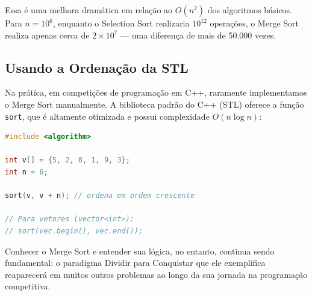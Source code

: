 \documentclass[12pt]{article}
\begin{document}
Essa é uma melhora dramática em relação ao $O(n^2)$ dos algoritmos básicos. Para $n = 10^6$, enquanto o Selection Sort realizaria $10^{12}$ operações, o Merge Sort realiza apenas cerca de $2 \times 10^7$ — uma diferença de mais de 50.000 vezes.

\subsection{Usando a Ordenação da STL}

Na prática, em competições de programação em C++, raramente implementamos o Merge Sort manualmente. A biblioteca padrão do C++ (STL) oferece a função \texttt{sort}, que é altamente otimizada e possui complexidade $O(n \log n)$:

\begin{lstlisting}[language=C++]
#include <algorithm>

int v[] = {5, 2, 8, 1, 9, 3};
int n = 6;

sort(v, v + n); // ordena em ordem crescente

// Para vetores (vector<int>):
// sort(vec.begin(), vec.end());
\end{lstlisting}

Conhecer o Merge Sort e entender sua lógica, no entanto, continua sendo fundamental: o paradigma Dividir para Conquistar que ele exemplifica reaparecerá em muitos outros problemas ao longo da sua jornada na programação competitiva.
\end{document}
